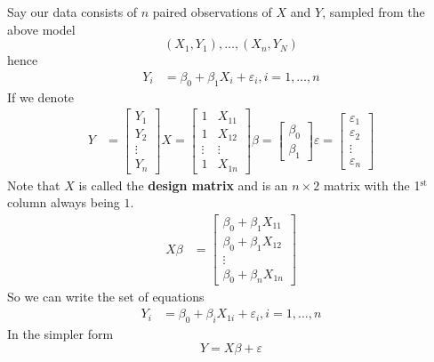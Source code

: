 \documentclass[12 pt]{article}
\begin{document}
Say our data consists of $n$ paired observations of $X$ and $Y$,
sampled from the above model
$$(X_1, Y_1), \ldots, (X_n, Y_N)$$
hence
\begin{align*}
  Y_i &= \beta_0 + \beta_1 X_i + \varepsilon_i, i = 1, \ldots, n
\end{align*}
If we denote
\begin{align*}
  Y & =
      \begin{bmatrix}
        Y_1 \\ Y_2 \\ \vdots \\ Y_n
      \end{bmatrix} X =
  \begin{bmatrix}
    1 & X_{11}\\ 1& X_{12} \\ \vdots &\vdots \\ 1 & X_{1n}
  \end{bmatrix}
                                                    \beta =
                                                    \begin{bmatrix}
                                                      \beta_0 \\ \beta_1
                                                    \end{bmatrix}
\varepsilon =
  \begin{bmatrix}
    \varepsilon_1 \\ \varepsilon_2 \\ \vdots \\ \varepsilon_n
  \end{bmatrix}
\end{align*}
Note that $X$ is called the \textbf{design matrix} and is an $n \times
2$ matrix with the 1$^{\text{st}}$ column always being $1$.
\begin{align*}
  X\beta & =
           \begin{bmatrix}
             \beta_0 + \beta_1 X_{11}
             \\ \beta_0 + \beta_1 X_{12}
             \\ \vdots
             \\ \beta_0 + \beta_n X_{1n}
           \end{bmatrix}
\end{align*}
So we can write the set of equations
\begin{align*}
  Y_i & = \beta_0 + \beta_iX_{1i} + \varepsilon_i, i=1, \ldots, n
\end{align*}
In the simpler form
$$Y = X\beta + \varepsilon$$
\end{document}
